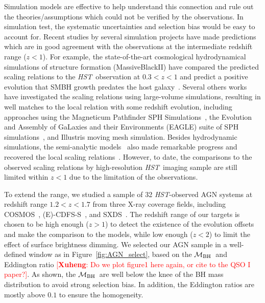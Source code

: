 \documentclass{natureprintstyle}
\newcommand{\hst}{{\it HST}}
\newcommand{\mbh}{$\mathcal M_{\rm BH}$}
\newcommand{\ding}[1]{\textcolor{red}{[{\bf Xuheng}: #1]}}
\begin{document}
Simulation models are effective to help understand this connection and rule out the theories/assumptions which could not be verified by the observations. In simulation test, the systematic uncertainties and selection bias would be easy to account for. Recent studies by several simulation projects have made predictions which are in good agreement with the observations at the intermediate redshift range ($z<1$). For example, the state-of-the-art cosmological hydrodynamical simulations of structure formation (MassiveBlackII) have compared the predicted scaling relations to the \hst\ observation at $0.3<z<1$ and predict a positive evolution that SMBH growth predates the host galaxy~\cite{DeG++15}. Several others works have investigated the scaling relations using large-volume simulations, resulting in well matches to the local relation with some redshift evolution, including approaches using the Magneticum Pathfinder SPH Simulations~\cite{Steinborn2015}, the Evolution and Assembly of GaLaxies and their Environments (EAGLE) suite of SPH simulations~\cite{Schaye2015}, and Illustris moving mesh simulation\cite{Sijacki2015, Vogelsberger2014}. Besides hydrodynamic simulations, the semi-analytic models~\cite{Menci2014, Menci2016} also made remarkable progress and recovered the local scaling relations~\cite{Kormendy13}. However, to date, the comparisons to the observed scaling relations by high-resolution \hst\ imaging sample are still limited within $z<1$ due to the limitation of the observations.

To extend the range, we studied a sample of 32 \hst-observed AGN systems at redshift range $1.2<z<1.7$ from three X-ray coverage fields, including COSMOS~\cite{Civano2016}, (E)-CDFS-S~\cite{Lehmer2005, Xue2011}, and SXDS~\cite{Ueda2008}. The redshift range of our targets is chosen to be high enough ($z>1$) to detect the existence of the evolution offsets and make the comparison to the models, while low enough ($z<2$) to limit the effect of surface brightness dimming. We selected our AGN sample in a well-defined window as in Figure~\ref{fig:AGN_select}, based on the \mbh\ and Eddington ratio \ding{Do we plot figure1 here again, or cite to the QSO I paper?}. As shown, the \mbh\ are well below the knee of the BH mass distribution to avoid strong selection bias. In addition, the Eddington ratios are mostly above $0.1$ to ensure the homogeneity.
\end{document}
